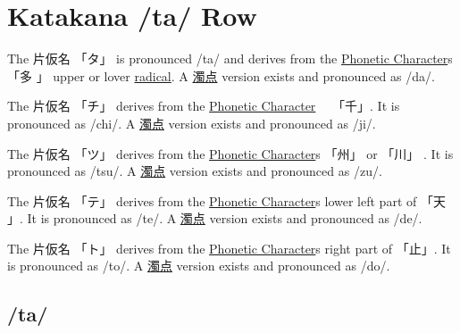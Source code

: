 \section{Katakana /ta/ Row}\label{sec:KatakanaTaRow}


\label{letter:ta} The  片仮名 {「タ」} is pronounced  /ta/ and
derives from the \hyperref[sec:PhoneticCharacter]{Phonetic Character}s {「多 」}
upper or lover \hyperref[sec:Radical]{radical}.  A \hyperref[sec:Dakuten]{濁点}
version exists and pronounced as /da/.

\label{letter:chi} The 片仮名 {「チ」} derives from the
\hyperref[sec:PhoneticCharacter]{Phonetic Character}　 {「千」}.  It is
pronounced as /chi/.  A \hyperref[sec:Dakuten]{濁点} version exists and
pronounced as /ji/.

\label{letter:tsu} The 片仮名 {「ツ」} derives from the
\hyperref[sec:PhoneticCharacter]{Phonetic Character}s {「州」} or {「川」} .  It
is pronounced as /tsu/.  A \hyperref[sec:Dakuten]{濁点} version exists and
pronounced as /zu/. 

\label{letter:te} The 片仮名 {「テ」} derives from the
\hyperref[sec:PhoneticCharacter]{Phonetic Character}s lower left part of {「天
」}.  It is pronounced as /te/.  A \hyperref[sec:Dakuten]{濁点} version exists
and pronounced as /de/.  

\newpage

\label{letter:to} The 片仮名 {「ト」} derives from the
\hyperref[sec:PhoneticCharacter]{Phonetic Character}s right part of {「止」}.
It is pronounced as /to/.  A \hyperref[sec:Dakuten]{濁点} version exists and
pronounced as /do/.

 

\newpage

\subsection{/ta/}\label{sec:KatakanaTa}


